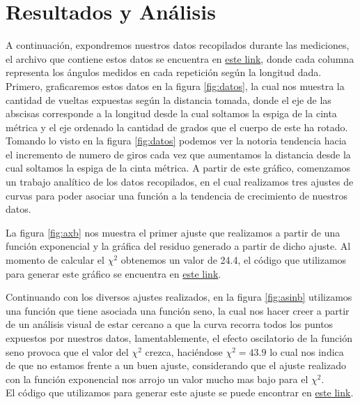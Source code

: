 \documentclass[11pt]{article}
\begin{document}
\section{Resultados y Análisis}
A continuación, expondremos nuestros datos recopilados durante las mediciones, el archivo que contiene estos datos se encuentra en \href{https://github.com/ayalin7/El-proyectito/blob/main/graficos/datos/giro.txt}{este link}, donde cada columna representa los ángulos medidos en cada repetición según la longitud dada. Primero, graficaremos estos datos en la figura \ref{fig:datos}, la cual nos muestra la cantidad de vueltas expuestas según la distancia tomada, donde el eje de las abscisas corresponde a la longitud desde la cual soltamos la espiga de la cinta métrica y el eje ordenado la cantidad de grados que el cuerpo de este ha rotado. \\

Tomando lo visto en la figura \ref{fig:datos} podemos ver la notoria tendencia hacia el incremento de numero de giros cada vez que aumentamos la distancia desde la cual soltamos la espiga de la cinta métrica. A partir de este gráfico, comenzamos un trabajo analítico de los datos recopilados, en el cual realizamos tres ajustes de curvas para poder asociar una función a la tendencia de crecimiento de nuestros datos. 

\medskip

La figura \ref{fig:axb} nos muestra el primer ajuste que realizamos a partir de una función exponencial y la gráfica del residuo generado a partir de dicho ajuste. Al momento de calcular el $\chi^2$ obtenemos un valor de 24.4, el código que utilizamos para generar este gráfico se encuentra en \href{https://github.com/ayalin7/El-proyectito/blob/main/graficos/grafico-modelo-axb.py}{este link}.

\medskip

Continuando con los diversos ajustes realizados, en la figura \ref{fig:asinb} utilizamos una función que tiene asociada una función seno, la cual nos hacer creer a partir de un análisis visual de estar cercano a que la curva recorra todos los puntos expuestos por nuestros datos, lamentablemente, el efecto oscilatorio de la función seno provoca que el valor del $\chi^2$ crezca, haciéndose $\chi^2 = 43.9$ lo cual nos indica de que no estamos frente a un buen ajuste, considerando que el ajuste realizado con la función exponencial nos arrojo un valor mucho mas bajo para el $\chi^2$. \\ El código que utilizamos para generar este ajuste se puede encontrar en \href{https://github.com/ayalin7/El-proyectito/blob/main/graficos/grafico-modelo-asinb.py}{este link}.
\end{document}
